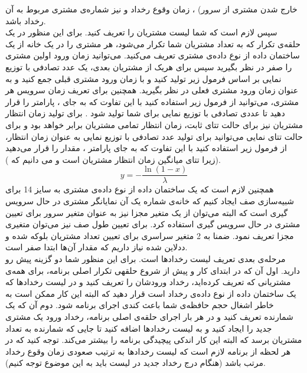 \documentclass[12pt]{article}
\begin{document}
\begin{itemize}
خارج شدن مشتری از سرور) ، زمان وقوع رخداد و نیز شماره‌ی مشتری مربوط به آن رخداد باشد.
    \\
سپس لازم است که شما لیست مشتریان را تعریف کنید. برای این منظور در یک حلقه‌ی تکرار که به تعداد مشتریان شما تکرار می‌شود، هر مشتری را در یک خانه از یک ساختمان داده از نوع داده‌ی مشتری تعریف می‌کنید. می‌توانید زمان ورود اولین مشتری را صفر در نظر بگیرید سپس برای هریک از مشتریان بعدی، یک عدد تصادفی با توزیع نمایی بر اساس فرمول زیر تولید کنید و با زمان ورود مشتری قبلی جمع کنید و به عنوان زمان ورود مشتری فعلی در نظر بگیرید. همچنین برای تعریف زمان سرویس هر مشتری،
می‌توانید از فرمول زیر استفاده کنید با این تفاوت که به جای
\lr{$\lambda$}
 ، پارامتر
 \lr{$\mu$}
 را قرار دهید تا عددی تصادفی با توزیع نمایی برای شما
تولید شود . برای تولید زمان انتظار مشتریان نیز برای حالت تتای ثابت، زمان انتظار تمامی مشتریان برابر
\lr{$\theta$} 
 خواهد بود و برای حالت
تتای نمایی می‌توانید برای تولید عدد تصادفی با توزیع نمایی به عنوان زمان انتظار، از فرمول زیر استفاده کنید با این تفاوت که به 
جای پارامتر 
\lr{$\lambda$}
، مقدار 
 را قرار می‌دهید (زیرا تتای میانگین زمان انتظار مشتریان است و می دانیم که 
).
    \[
    y = - \frac{\ln(1 - x)}{\lambda}
    \]
    همچنین لازم است که یک ساختمان داده از نوع داده‌ی مشتری به سایز 14 برای شبیه‌سازی صف ایجاد کنیم که خانه‌ی شماره یک آن نمایانگر مشتری در حال سرویس گیری است که البته می‌توان از یک متغیر مجزا نیز به عنوان متغیر سرور برای تعیین مشتری در حال سرویس گیری استفاده کرد. برای تعیین طول صف نیز می‌توان متغیری مجزا تعریف نمود. ضمنا به 2 متغیر
سراسری برای تعیین تعداد مشتریان بلوکه شده و ددلاین شده نیاز داریم که مقدار آن‌ها ابتدا صفر است.
    \\
    مرحله‌ی بعدی تعریف لیست رخدادها است. برای این منظور شما دو گزینه پیش رو دارید. اول آن که در ابتدای کار و پیش از شروع حلقهی‌ تکرار اصلی برنامه، برای همه‌ی مشتریانی که تعریف کرده‌اید، رخداد ورودشان را تعریف کنید و در لیست رخدادها که یک ساختمان داده از نوع داده‌ی رخداد است قرار دهید که البته این کار ممکن است به خاطر اشغال حجم حافظه‌ی  شما باعث کندی اجرای برنامه شود. دوم آن که یک شمارنده تعریف کنید و در هر بار اجرای حلقه‌ی اصلی برنامه، رخداد ورود یک مشتری جدید را ایجاد کنید و به لیست رخدادها اضافه کنید تا جایی که شمارنده به تعداد مشتریان برسد که البته این کار اندکی پیچیدگی برنامه را بیشتر می‌کند. توجه کنید که در هر لحظه از برنامه لازم است که لیست رخدادها به ترتیب صعودی زمان وقوع رخداد مرتب باشد (هنگام درج رخداد جدید در لیست باید به این موضوع توجه کنیم).
    \\

\end{itemize}
\end{document}
